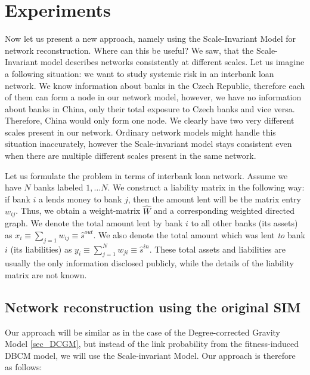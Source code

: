 \chapter{Experiments}
Now let us present a new approach, namely using the Scale-Invariant Model for network reconstruction. Where can this be useful? We saw, that the Scale-Invariant model describes networks consistently at different scales. Let us imagine a following situation: we want to study systemic risk in an interbank loan network. We know information about banks in the Czech Republic, therefore each of them can form a node in our network model, however, we have no information about banks in China, only their total exposure to Czech banks and vice versa. Therefore, China would only form one node. We clearly have two very different scales present in our network. Ordinary network models might handle this situation inaccurately, however the Scale-invariant model stays consistent even when there are multiple different scales present in the same network.

Let us formulate the problem in terms of interbank loan network. Assume we have $N$ banks labeled $1,\dots N$. We construct a liability matrix in the following way: if bank $i$ a lends money to bank $j$, then the amount lent will be the matrix entry $w_{ij}$. Thus, we obtain a weight-matrix $\hat{W}$ and a corresponding weighted directed graph. We denote the total amount lent by bank $i$ to all other banks (its assets) as $x_i \equiv \sum_{j=1} w_{ij} \equiv \hat{s}^{out}$. We also denote the total amount which was lent \textit{to} bank $i$ (its liabilities) as $y_i \equiv \sum_{j=1}^N w_{ji} \equiv \hat{s}^{in}$. These total assets and liabilities are usually the only information disclosed publicly, while the details of the liability matrix are not known. 

\section{Network reconstruction using the original SIM}

Our approach will be similar as in the case of the Degree-corrected Gravity Model \ref{sec_DCGM}, but instead of the link probability from the fitness-induced DBCM model, we will use the Scale-invariant Model. Our approach is therefore as follows:

